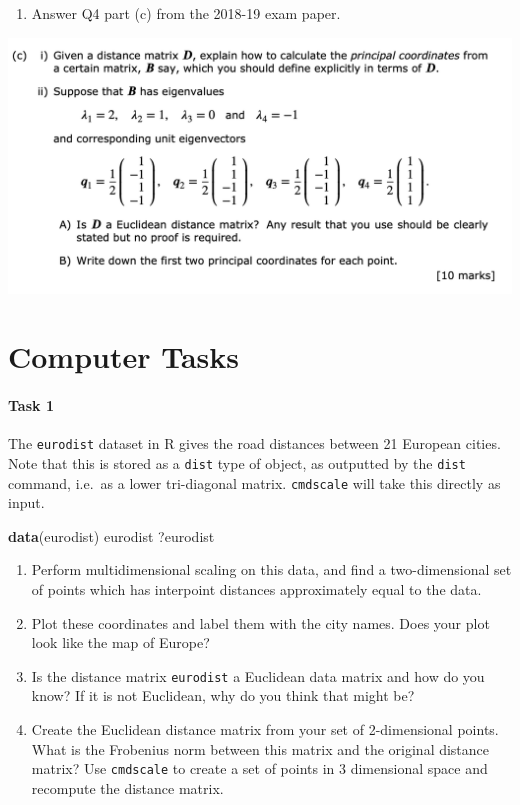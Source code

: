 \documentclass[
]{book}
\newenvironment{Shaded}{\begin{snugshade}}{\end{snugshade}}
\newcommand{\FunctionTok}[1]{\textcolor[rgb]{0.13,0.29,0.53}{\textbf{#1}}}
\newcommand{\NormalTok}[1]{#1}
\providecommand{\tightlist}{%
  \setlength{\itemsep}{0pt}\setlength{\parskip}{0pt}}
\theoremstyle{definition}
\theoremstyle{definition}
\theoremstyle{definition}
\theoremstyle{definition}
\theoremstyle{remark}
\begin{document}
\begin{enumerate}
\def\labelenumi{\arabic{enumi}.}
\setcounter{enumi}{3}
\tightlist
\item
  Answer Q4 part (c) from the 2018-19 exam paper.
\end{enumerate}

\includegraphics{figs/MDS_2018_19_Q4.png}

\hypertarget{computer-tasks-2}{%
\section{Computer Tasks}\label{computer-tasks-2}}

\hypertarget{task-1-1}{%
\paragraph*{Task 1}\label{task-1-1}}

The \texttt{eurodist} dataset in R gives the road distances between 21 European cities. Note that this is stored as a \texttt{dist} type of object, as outputted by the \texttt{dist} command, i.e.~as a lower tri-diagonal matrix. \texttt{cmdscale} will take this directly as input.

\begin{Shaded}
\begin{Highlighting}[]
\FunctionTok{data}\NormalTok{(eurodist)}
\NormalTok{eurodist}
\NormalTok{?eurodist}
\end{Highlighting}
\end{Shaded}

\begin{enumerate}
\def\labelenumi{\roman{enumi}.}
\item
  Perform multidimensional scaling on this data, and find a two-dimensional set of points which has interpoint distances approximately equal to the data.
\item
  Plot these coordinates and label them with the city names. Does your plot look like the map of Europe?
\item
  Is the distance matrix \texttt{eurodist} a Euclidean data matrix and how do you know? If it is not Euclidean, why do you think that might be?
\item
  Create the Euclidean distance matrix from your set of 2-dimensional points. What is the Frobenius norm between this matrix and the original distance matrix? Use \texttt{cmdscale} to create a set of points in 3 dimensional space and recompute the distance matrix.
\end{enumerate}
\end{document}
